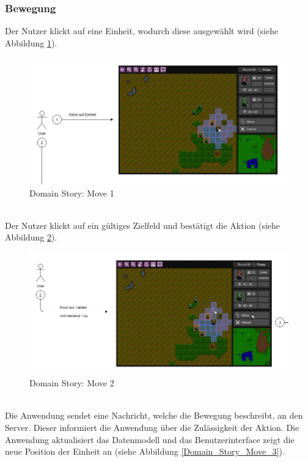 \documentclass[12pt, titlepage]{scrartcl}
\begin{document}
		    \subsubsection{Bewegung}
		    	Der Nutzer klickt auf eine Einheit, wodurch diese  ausgew\"ahlt wird (siehe Abbildung \ref{Domain_Story_Move_1}).
		    	\begin{figure}[H] 
		    		\centering
		    		\includegraphics[width=\textwidth]{images/domain_stories/moveStory1.png}
		    		\caption{Domain Story: Move 1}
		    		\label{Domain_Story_Move_1}
		    	\end{figure}
				\ \\ Der Nutzer klickt auf ein g\"ultiges Zielfeld und best\"atigt die Aktion (siehe Abbildung \ref{Domain_Story_Move_2}).
		    	\begin{figure}[H] 
		    		\centering
		    		\includegraphics[width=\textwidth]{images/domain_stories/moveStory2.png}
		    		\caption{Domain Story: Move 2}
		    		\label{Domain_Story_Move_2}
		    	\end{figure}
				\ \\ Die Anwendung sendet eine Nachricht, welche die Bewegung beschreibt, an den Server. Dieser informiert die Anwendung \"uber die Zul\"assigkeit der Aktion. Die Anwendung aktualisiert das Datenmodell und das Benutzerinterface zeigt die neue Position der Einheit an (siehe Abbildung \ref{Domain_Story_Move_3}).
\end{document}
